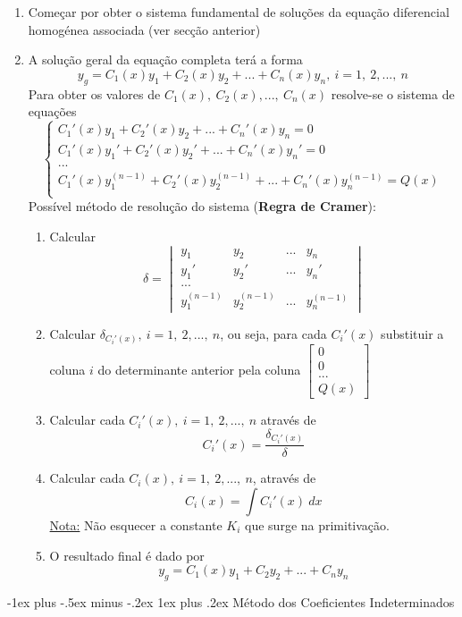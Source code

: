 \documentclass[10pt,landscape]{article}
\makeatletter
\newcommand{\RNum}[1]{\uppercase\expandafter{\romannumeral #1\relax}}
\renewcommand{\subsubsection}{\@startsection{subsubsection}{3}{0mm}%
                                {-1ex plus -.5ex minus -.2ex}%
                                {1ex plus .2ex}%
                                {\normalfont\small\bfseries}}
\makeatother
\begin{document}
\begin{multicols}{3}
\begin{enumerate}
\item Começar por obter o sistema fundamental de soluções da equação diferencial homogénea associada (ver secção anterior)
\item A solução geral da equação completa terá a forma
$$y_g = C_1(x) y_1 + C_2(x) y_2 + ... + C_n(x) y_n,\ i = 1,\ 2, ...,\ n$$
Para obter os valores de $C_1(x),\ C_2(x), ...,\ C_n(x)$ resolve-se o sistema de equações
$$\begin{cases}
C_1'(x)y_1 + C_2'(x)y_2 + ... + C_n'(x)y_n = 0\\
C_1'(x)y_1' + C_2'(x)y_2' + ... + C_n'(x)y_n' = 0\\
...\\
C_1'(x)y_1^{(n-1)} + C_2'(x)y_2^{(n-1)} + ... + C_n'(x)y_n^{(n-1)} = Q(x)\\
\end{cases}$$
Possível método de resolução do sistema (\textbf{Regra de Cramer}):
\begin{enumerate}
\item Calcular
$$\delta =
\begin{vmatrix}
y_1 & y_2 & ... & y_n \\
y_1' & y_2' & ... & y_n' \\
... \\
y_1^{(n-1)} & y_2^{(n-1)} & ... & y_n^{(n-1)}
\end{vmatrix}$$
\item Calcular $\delta_{C_i'(x)},\ i = 1,\ 2, ...,\ n$, ou seja, para cada $C_i'(x)$ substituir a coluna $i$ do determinante anterior pela coluna $\left[\begin{matrix}0\\0\\...\\Q(x)\end{matrix}\right]$
\item Calcular cada $C_i'(x),\ i = 1,\ 2, ...,\ n$ através de
$$C_i'(x) = \frac{\delta_{C_i'(x)}}{\delta}$$
\item Calcular cada $C_i(x),\ i = 1,\ 2, ...,\ n$, através de
$$C_i(x) = \int C_i'(x)\ dx$$
\underline{Nota:} Não esquecer a constante $K_i$ que surge na primitivação.
\item O resultado final é dado por
$$y_g = C_1(x)y_1 + C_2y_2 + ... + C_ny_n$$
\end{enumerate}
\end{enumerate}

\subsubsection{\texorpdfstring{\RNum{2}}{TEXT} Método dos Coeficientes Indeterminados}


\end{multicols}
\end{document}
